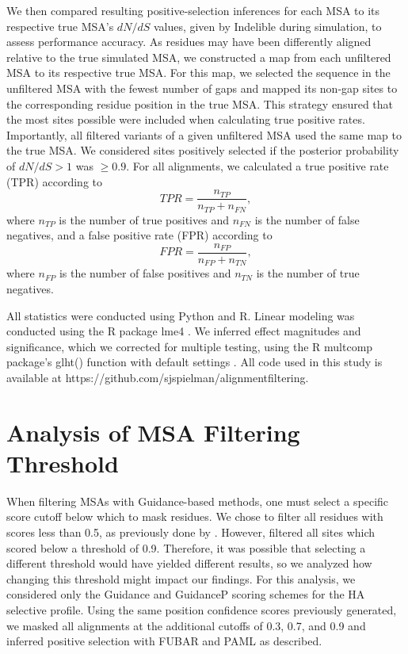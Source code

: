 \documentclass[11pt]{article}
\begin{document}
We then compared resulting positive-selection inferences for each MSA to its respective true MSA's $dN/dS$ values, given by Indelible during simulation, to assess performance accuracy. As residues may have been differently aligned relative to the true simulated MSA, we constructed a map from each unfiltered MSA to its respective true MSA. For this map, we selected the sequence in the unfiltered MSA with the fewest number of gaps and mapped its non-gap sites to the corresponding residue position in the true MSA. This strategy ensured that the most sites possible were included when calculating true positive rates. Importantly, all filtered variants of a given unfiltered MSA used the same map to the true MSA. We considered sites positively selected if the posterior probability of $dN/dS>1$ was $\geq0.9$. For all alignments, we calculated a true positive rate (TPR) according to \begin{equation} TPR = \frac{n_{TP}}{n_{TP} + n_{FN}}, \end{equation} where $n_{TP}$ is the number of true positives and $n_{FN}$ is the number of false negatives, and a false positive rate (FPR) according to \begin{equation} FPR = \frac{n_{FP}}{n_{FP} + n_{TN}}, \end{equation} where $n_{FP}$ is the number of false positives and $n_{TN}$ is the number of true negatives.

All statistics were conducted using Python and R. Linear modeling was conducted using the R package lme4 \citep{Bates2012}. We inferred effect magnitudes and significance, which we corrected for multiple testing, using the R multcomp package's glht() function with default settings \citep{Hothorn2008}. All code used in this study is available at https://github.com/sjspielman/alignment\underline{\hspace*{0.2cm}}filtering.

\section*{Analysis of MSA Filtering Threshold}
When filtering MSAs with Guidance-based methods, one must select a specific score cutoff below which to mask residues. We chose to filter all residues with scores less than 0.5, as previously done by \citet{Jordan2012}. However, \citet{Privman2012} filtered all sites which scored below a threshold of 0.9. Therefore, it was possible that selecting a different threshold would have yielded different results, so we analyzed how changing this threshold might impact our findings. For this analysis, we considered only the Guidance and GuidanceP scoring schemes for the HA selective profile. Using the same position confidence scores previously generated, we masked all alignments at the additional cutoffs of 0.3, 0.7, and 0.9 and inferred positive selection with FUBAR and PAML as described.
\end{document}
